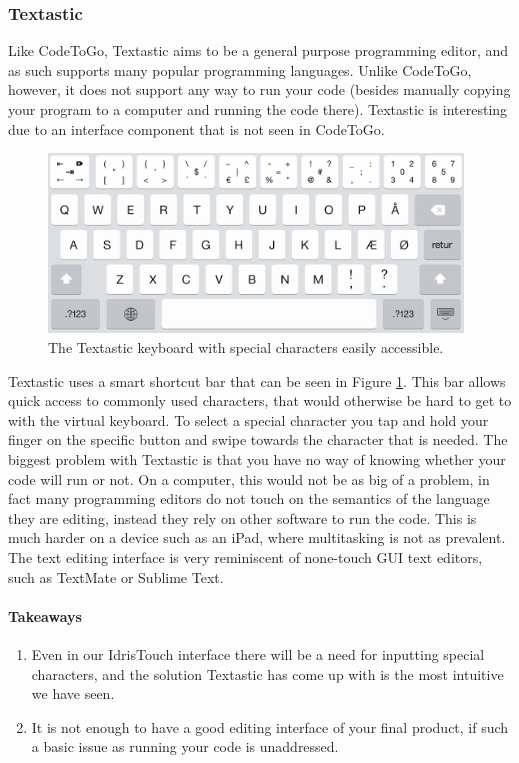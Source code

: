
\subsubsection{Textastic}
\label{subsub:Textastic}
Like CodeToGo, Textastic aims to be a general purpose programming editor, and as such supports many popular programming languages. Unlike CodeToGo, however, it does not support any way to run your code (besides manually copying your program to a computer and running the code there). Textastic is interesting due to an interface component that is not seen in CodeToGo.

\begin{figure}
	\centering
		\includegraphics[width=110mm]{diagrams/textastic_keyboard_screenshot.png}
	\caption{The Textastic keyboard with special characters easily accessible.}
\label{fig:textastic_keyboard_screenshot}
\end{figure}

Textastic uses a smart shortcut bar that can be seen in Figure \ref{fig:textastic_keyboard_screenshot}. This bar allows quick access to commonly used characters, that would otherwise be hard to get to with the virtual keyboard. To select a special character you tap and hold your finger on the specific button and swipe towards the character that is needed. The biggest problem with Textastic is that you have no way of knowing whether your code will run or not. On a computer, this would not be as big of a problem, in fact many programming editors do not touch on the semantics of the language they are editing, instead they rely on other software to run the code. This is much harder on a device such as an iPad, where multitasking is not as prevalent. The text editing interface is very reminiscent of none-touch GUI text editors, such as TextMate or Sublime Text. 

\paragraph{Takeaways}
\begin{enumerate}
	\item Even in our IdrisTouch interface there will be a need for inputting special characters, and the solution Textastic has come up with is the most intuitive we have seen.
	\item It is not enough to have a good editing interface of your final product, if such a basic issue as running your code is unaddressed.
\end{enumerate}


